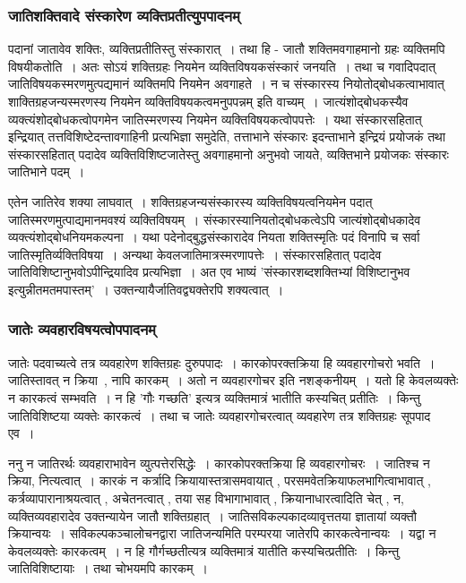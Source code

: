 			\subsubsection{जातिशक्तिवादे संस्कारेण व्यक्तिप्रतीत्युपपादनम्}

				पदानां जातावेव शक्तिः, व्यक्तिप्रतीतिस्तु संस्कारात्~। तथा हि - जातौ शक्तिमवगाहमानो ग्रहः व्यक्तिमपि विषयीकतोति~। अतः सोऽयं शक्तिग्रहः नियमेन व्यक्तिविषयकसंस्कारं जनयति~। तथा च गवादिपदात् जातिविषयकस्मरणमुत्पद्यमानं व्यक्तिमपि नियमेन अवगाहते~। न च संस्कारस्य नियोतोद्बोधकत्वाभावात् शाक्तिग्रहजन्यस्मरणस्य नियमेन व्यक्तिविषयकत्वमनुपपन्नम् इति वाच्यम्~। जात्यंशोद्बोधकस्यैव व्यक्त्यंशोद्बोधकत्वोपगमेन जातिस्मरणस्य नियमेन व्यक्तिविषयकत्वोपपत्तेः~। यथा संस्कारसहितात् इन्द्रियात् तत्तविशिष्टेदन्तावगाहिनी प्रत्यभिज्ञा समुदेति, तत्ताभाने संस्कारः इदन्ताभाने इन्द्रियं प्रयोजकं तथा संस्कारसहितात् पदादेव व्यक्तिविशिष्टजातेस्तु अवगाहमानो अनुभवो जायते, व्यक्तिभाने प्रयोजकः संस्कारः जातिभाने पदम्~।

				\begin{small}

					एतेन जातिरेव शक्या लाघवात्~। शक्तिग्रहजन्यसंस्कारस्य व्यक्तिविषयत्वनियमेन पदात् जातिस्मरणमुत्पाद्यमानमवश्यं व्यक्तिविषयम्~। संस्कारस्यानियतोद्बोधकत्वेऽपि जात्यंशोद्बोधकादेव व्यक्त्यंशोद्बोधनियमकल्पना~। यथा पदेनोद्बुद्धसंस्कारादेव नियता शक्तिस्मृतिः पदं विनापि च सर्वा जातिस्मृतिर्व्यक्तिविषया~। अन्यथा केवलजातिमात्रस्मरणापत्तेः~। संस्कारसहितात् पदादेव जातिविशिष्टानुभवोऽपीन्द्रियादिव प्रत्यभिज्ञा~। अत एव भाष्यं ’संस्कारशब्दशक्तिभ्यां विशिष्टानुभव इत्युन्नीतमतमपास्तम्’~।  उक्तन्यायैर्जातिवद्व्यक्तेरपि शक्यत्वात्~।
				\end{small}

			\subsubsection{जातेः व्यवहारविषयत्वोपपादनम्}

				जातेः पदवाच्यत्वे तत्र व्यवहारेण  शक्तिग्रहः दुरुपपादः~। कारकोपरक्तक्रिया हि व्यवहारगोचरो भवति~। जातिस्तावत् न क्रिया~, नापि कारकम्~। अतो न व्यवहारगोचर इति नशङ्कनीयम्~। यतो हि केवलव्यक्तेः न कारकत्वं सम्भवति~। न हि 'गौः गच्छति' इत्यत्र व्यक्तिमात्रं भातीति कस्यचित् प्रतीतिः~। किन्तु जातिविशिष्टया व्यक्तेः कारकत्वं~। तथा च जातेः व्यवहारगोचरत्वात् व्यवहारेण तत्र शक्तिग्रहः सूपपाद एव~।
			
				\begin{small}
		
					ननु न जातिरर्थः व्यवहाराभावेन व्युत्पत्तेरसिद्धेः~। कारकोपरक्तक्रिया हि व्यवहारगोचरः~। जातिश्च न क्रिया, नित्यत्वात्~। कारकं न कर्त्रादि क्रियायास्तत्रासमवायात् , परसमवेतक्रियाफलभागित्वाभावात् , कर्त्रव्यापारानाश्रयत्वात् , अचेतनत्वात् , तया सह विभागाभावात् , क्रियानाधारत्वादिति चेत् , न, व्यक्तिव्यवहारादेव उक्तन्यायेन जातौ शक्तिग्रहात्~। जातिसविकल्पकादव्यावृत्ततया ज्ञातायां व्यक्तौ क्रियान्वयः~। सविकल्पकञ्चालोचनद्वारा जातिजन्यमिति परम्परया जातेरपि कारकत्वेनान्वयः~। यद्वा न केवलव्यक्तेः कारकत्वम्~। न हि गौर्गच्छतीत्यत्र व्यक्तिमात्रं यातीति कस्यचित्प्रतीतिः~। किन्तु जातिविशिष्टायाः~। तथा चोभयमपि कारकम्~।
				\end{small}
				

